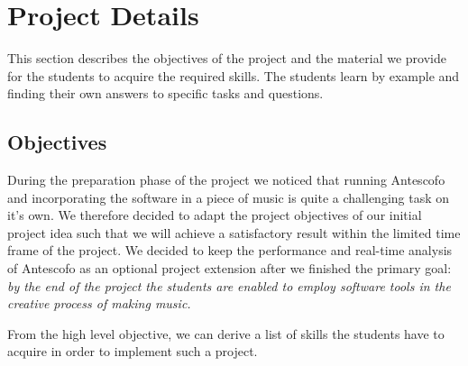 \documentclass[onecolumn,nocopyrightspace,preprint]{sigplanconf}
\begin{document}
\section{Project Details}\label{sec:objectives}

This section describes the objectives of the project and the material we
provide for the students to acquire the required skills. The students learn by
example and finding their own answers to specific tasks and questions.

\subsection{Objectives}

During the preparation phase of the project we noticed that running Antescofo
and incorporating the software in a piece of music is quite a challenging task
on it's own. We therefore decided to adapt the project objectives of our initial
project idea such that we will achieve a satisfactory result within the limited time
frame of the project. We decided to keep the performance and real-time analysis of
Antescofo as an optional project extension after we finished the primary goal:
\textit{by the end of the project the students are enabled to employ software
tools in the creative process of making music.}

From the high level objective, we can derive a list of skills the students
have to acquire in order to implement such a project.
\end{document}
